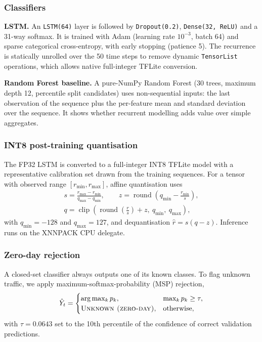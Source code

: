 \documentclass[]{interact}
\theoremstyle{plain}
\theoremstyle{definition}
\begin{document}
\subsubsection{Classifiers}
\textbf{LSTM.} An \texttt{LSTM(64)} layer is followed by \texttt{Dropout(0.2)}, \texttt{Dense(32, ReLU)} and a 31-way softmax. It is trained with Adam (learning rate $10^{-3}$, batch 64) and sparse categorical cross-entropy, with early stopping (patience 5). The recurrence is statically unrolled over the 50 time steps to remove dynamic \texttt{TensorList} operations, which allows native full-integer TFLite conversion.

\textbf{Random Forest baseline.} A pure-NumPy Random Forest (30 trees, maximum depth 12, percentile split candidates) uses non-sequential inputs: the last observation of the sequence plus the per-feature mean and standard deviation over the sequence. It shows whether recurrent modelling adds value over simple aggregates.

\subsubsection{INT8 post-training quantisation}
The FP32 LSTM is converted to a full-integer INT8 TFLite model with a representative calibration set drawn from the training sequences. For a tensor with observed range $[r_{\min}, r_{\max}]$, affine quantisation uses
\begin{gather}
  s = \frac{r_{\max}-r_{\min}}{q_{\max}-q_{\min}}, \qquad
  z = \operatorname{round}\!\left(q_{\min} - \frac{r_{\min}}{s}\right), \\
  q = \operatorname{clip}\!\left(\operatorname{round}\!\left(\frac{r}{s}\right) + z,\ q_{\min},\ q_{\max}\right),
\end{gather}
with $q_{\min}=-128$ and $q_{\max}=127$, and dequantisation $\hat{r}=s(q-z)$. Inference runs on the XNNPACK CPU delegate.

\subsubsection{Zero-day rejection}
A closed-set classifier always outputs one of its known classes. To flag unknown traffic, we apply maximum-softmax-probability (MSP) rejection,
\begin{equation}
  \hat{Y}_t = \begin{cases}
  \arg\max_k p_k, & \max_k p_k \ge \tau,\\
  \textsc{Unknown (zero-day)}, & \text{otherwise},
  \end{cases}
\end{equation}
with $\tau=0.0643$ set to the 10th percentile of the confidence of correct validation predictions.
\end{document}
